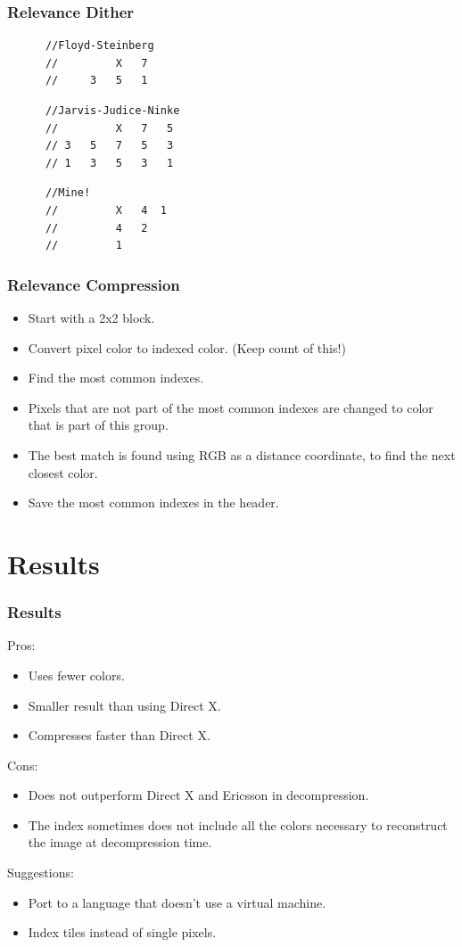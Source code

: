 \documentclass{beamer}
\begin{document}
\begin{frame}[fragile]
   \frametitle{Relevance Dither}
\begin{verbatim}
      //Floyd-Steinberg
      //         X   7
      //     3   5   1
\end{verbatim}
\begin{verbatim}
      //Jarvis-Judice-Ninke
      //         X   7   5 
      // 3   5   7   5   3
      // 1   3   5   3   1
\end{verbatim}
\begin{verbatim}
      //Mine!
      //         X   4  1
      //         4   2
      //         1
\end{verbatim}

\end{frame}

\begin{frame}
   \frametitle{Relevance Compression}
   \begin{itemize}
   \item{Start with a 2x2 block.}
   \item{Convert pixel color to indexed color. (Keep count of this!)}
   \item{Find the most common indexes.}
   \item{Pixels that are not part of the most common indexes are changed to color that is part of this group.}
   \item{The best match is found using RGB as a distance coordinate, to find the next closest color.}
   \item{Save the most common indexes in the header.}
   \end{itemize}
\end{frame}

\section{Results}
\begin{frame}
   \frametitle{Results}
   \pause
   Pros:
   \begin{itemize}
   \item{Uses fewer colors.}
   \item{Smaller result than using Direct X.}
   \item{Compresses faster than Direct X.}
   \end{itemize}
   \pause
   Cons:
   \begin{itemize}
   \item{Does not outperform Direct X and Ericsson in decompression.}
   \item{The index sometimes does not include all the colors necessary to reconstruct the image at decompression time.}
   \end{itemize}
   \pause
   Suggestions:
   \begin{itemize}
   \item{Port to a language that doesn't use a virtual machine.}
   \item{Index tiles instead of single pixels.}
   \end{itemize}
\end{frame}
\end{document}
